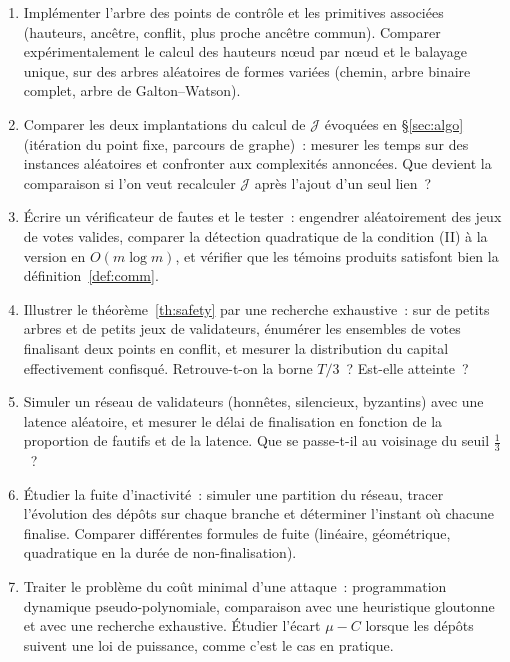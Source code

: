 \documentclass[11pt,a4paper]{article}
\theoremstyle{plain}
\theoremstyle{definition}
\newcommand{\Jj}{\mathcal{J}}
\begin{document}
\medskip
\begin{enumerate}[leftmargin=2em,itemsep=3pt]
\item Implémenter l'arbre des points de contrôle et les primitives associées (hauteurs,
ancêtre, conflit, plus proche ancêtre commun). Comparer expérimentalement le calcul des
hauteurs n\oe ud par n\oe ud et le balayage unique, sur des arbres aléatoires de formes
variées (chemin, arbre binaire complet, arbre de Galton--Watson).

\item Comparer les deux implantations du calcul de $\Jj$ évoquées en §\ref{sec:algo}
(itération du point fixe, parcours de graphe)~: mesurer les temps sur des instances
aléatoires et confronter aux complexités annoncées. Que devient la comparaison si l'on veut
recalculer $\Jj$ après l'ajout d'un seul lien~?

\item Écrire un vérificateur de fautes et le tester~: engendrer aléatoirement des jeux de
votes valides, comparer la détection quadratique de la condition (II) à la version en
$O(m\log m)$, et vérifier que les témoins produits satisfont bien la
définition~\ref{def:comm}.

\item Illustrer le théorème~\ref{th:safety} par une recherche exhaustive~: sur de petits
arbres et de petits jeux de validateurs, énumérer les ensembles de votes finalisant deux
points en conflit, et mesurer la distribution du capital effectivement confisqué. Retrouve-t-on
la borne $T/3$~? Est-elle atteinte~?

\item Simuler un réseau de validateurs (honnêtes, silencieux, byzantins) avec une latence
aléatoire, et mesurer le délai de finalisation en fonction de la proportion de fautifs et de
la latence. Que se passe-t-il au voisinage du seuil $\tfrac13$~?

\item Étudier la fuite d'inactivité~: simuler une partition du réseau, tracer l'évolution des
dépôts sur chaque branche et déterminer l'instant où chacune finalise. Comparer différentes
formules de fuite (linéaire, géométrique, quadratique en la durée de non-finalisation).

\item Traiter le problème du coût minimal d'une attaque~: programmation dynamique
pseudo-polynomiale, comparaison avec une heuristique gloutonne et avec une recherche
exhaustive. Étudier l'écart $\mu-C$ lorsque les dépôts suivent une loi de puissance, comme
c'est le cas en pratique.


\end{enumerate}
\end{document}
